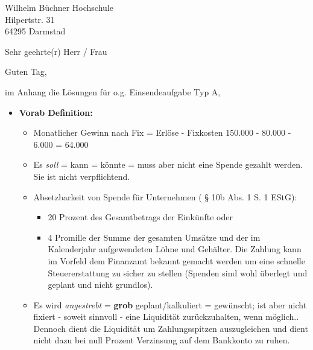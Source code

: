 \documentclass[
    version=last,           %
    DIV=13,                 %
    BCOR=0mm,               %
    paper=a4,               %
    fontsize=12pt,          %
    firsthead=on,           %
    firstfoot=on,           %
    pagenumber=on,i         %
    parskip=half,           %
    enlargefirstpage=,      %
    firsthead=on,           %
    fromrule=afteraddress,  %
    priority=off,           %
    backaddress=true,       %
    refline=dateright,      %
	fromalign=right,	    %
    fromemail=on,i          %
    fromurl=on,             %
    frombank=on,
    fromphone=on,           %
    frommobilephone=on      %
    fromlogo=on,            %
    addrfield=on,           %
    subject=untitled,  %
    foldmarks=off,          %
    numericaldate=off,      %
	pagenumber=right,	        %
	parskip=half,	        %
    headsep=false,          %
    footsepline=true,       %
    foldmarks=off,		    %
	]{scrlttr2}
\begin{document}

\begin{letter} {Wilhelm Büchner Hochschule \\
Hilpertstr. 31\\
64295 Darmstad}



\opening{Sehr geehrte(r) Herr / Frau}

Guten Tag,

im Anhang die Lösungen für o.g. Einsendeaufgabe Typ A,
\\

\begin{itemize}
\item \textbf{Vorab Definition:}
    \begin{itemize}
    \item
        Monatlicher Gewinn nach Fix = Erlöse - Fixkosten
        150.000 - 80.000 - 6.000 =   64.000
    \item Es \textit{soll} = kann = könnte = muss aber nicht eine Spende
        gezahlt werden. Sie ist nicht verpflichtend.
    \item Absetzbarkeit von Spende für Unternehmen ( § 10b Abs. 1 S. 1 EStG):
        \begin{itemize}
        \item 20 Prozent des Gesamtbetrags der Einkünfte oder
        \item 4 Promille der Summe der gesamten Umsätze und der im
            Kalenderjahr aufgewendeten Löhne und Gehälter. Die Zahlung
            kann im Vorfeld dem Finanzamt bekannt gemacht werden um eine
            schnelle Steuererstattung zu sicher zu stellen (Spenden sind
            wohl überlegt und geplant und nicht grundlos).
        \end{itemize}
    \item  Es wird \textit{ angestrebt } = \textbf{grob} geplant/kalkuliert =
        gewünscht; ist aber nicht fixiert - soweit sinnvoll - eine  Liquidität
        zurückzuhalten, wenn möglich.. Dennoch dient die Liquidität um
        Zahlungsspitzen auszugleichen und dient nicht dazu bei null Prozent
        Verzinsung auf dem
        Bankkonto zu ruhen.
    \end{itemize}
\end{itemize}


\end{letter}
\end{document}
